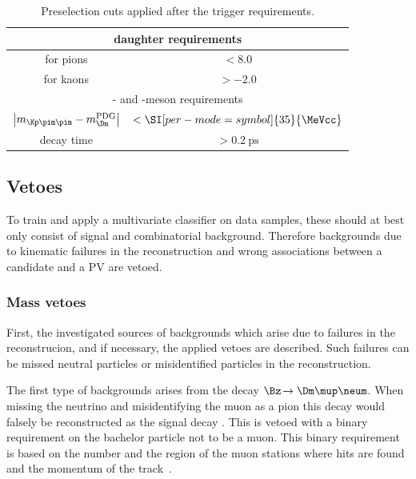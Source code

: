 \begin{table}[tbp]
	\centering
	\caption{Preselection cuts applied after the trigger requirements.}
	\begin{tabular}{cc}
		\toprule
		\multicolumn{2}{c}{\Dm daughter requirements}\\
		\midrule
		\dllkpi for pions	& $<8.0$ \\
		\dllkpi for kaons 	& $>-2.0$ \\
		\midrule
		\multicolumn{2}{c}{\Dm- and \Bz-meson requirements}\\
		\midrule
		$\left|m_{\Kp\pim\pim}-m_\Dm^{\text{PDG}}\right|$	& $<\SI[per-mode=symbol]{35}{\MeVcc}$ \\
		\Bz decay time										& $>\SI{0.2}{\pico\second}$ \\
		\bottomrule
	\end{tabular}
	\label{tab:preselection}
\end{table}

\subsection{Vetoes}
\label{sec:vetoes}

To train and apply a multivariate classifier on data samples, these should at best only consist of signal and combinatorial background.
Therefore backgrounds due to kinematic failures in the reconstruction and wrong associations between a \Bz candidate and a \ac{PV} are vetoed.

\subsubsection*{Mass vetoes}

First, the investigated sources of backgrounds which arise due to failures in the reconstrucion, and if necessary, the applied vetoes are described.
Such failures can be missed neutral particles or misidentified particles in the reconstruction.

The first type of backgrounds arises from the decay $\Bz\!\to\Dm\mup\neum$. When missing the neutrino and misidentifying the muon as a pion this decay would falsely be reconstructed as the signal decay \BdToDpi.
This is vetoed with a binary requirement on the bachelor particle not to be a muon.
This binary requirement is based on the number and the region of the muon stations where hits are found and the momentum of the track~\cite{Archilli:2013npa}.

